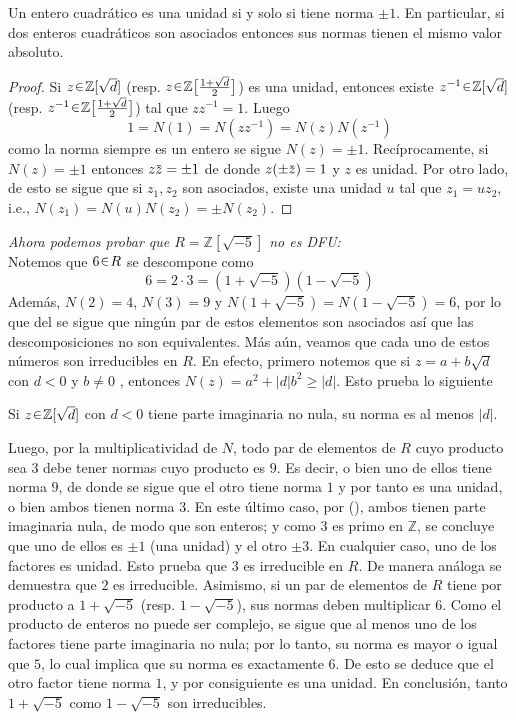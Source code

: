 \begin{sol}
\begin{enumerate}[label={\bfseries\Roman*}., wide, itemsep=1em]
\begin{lema}\label{lema:unidades}
Un entero cuadrático es una unidad si y solo si tiene norma $\pm1$. En particular, si dos enteros cuadráticos son asociados entonces sus normas tienen el mismo valor absoluto.
\end{lema}\vspace{-1.5em}
\begin{proof}
Si $z \en \mathbb{Z}[\sqrt{d}]$ (resp. $z\en\mathbb{Z}\big[\frac{1+\sqrt{d}}{2}\big]$) es una unidad, entonces existe $z^{-1} \en \mathbb{Z}[\sqrt{d}]$ (resp. $z^{-1}\en\mathbb{Z}\big[\frac{1+\sqrt{d}}{2}\big]$) tal que $zz^{-1} = 1$. Luego \[1 = N(1) = N(zz^{-1}) = N(z)N(z^{-1})\] como la norma siempre es un entero se sigue $N(z) = \pm1$. Recíprocamente, si $N(z) = \pm1$ entonces $z\ubar{z} = \pm1$ de donde $z(\pm\ubar{z}) = 1$ y $z$ es unidad. Por otro lado, de esto se sigue que si $z_1,z_2$ son asociados, existe una unidad $u$ tal que $z_1 = uz_2$, i.e., $N(z_1) = N(u)N(z_2) = \pm N(z_2)$.
\end{proof}
\emph{Ahora podemos probar que $R = \mathbb{Z}[\sqrt{-5}]$ no es DFU:}\\
Notemos que $6 \en R$ se descompone como  
\[
6 = 2 \cdot 3 = (1 + \sqrt{-5})(1 - \sqrt{-5})
\]
Además, $N(2) = 4$, $N(3) = 9$ y $N(1+\sqrt{-5}) = N(1-\sqrt{-5}) = 6$, por lo que del  se sigue que ningún par de estos elementos son asociados así que las descomposiciones no son equivalentes. Más aún, veamos que cada uno de estos números son irreducibles en $R$. En efecto, primero notemos que si $z = a + b\sqrt{d}$ con $d<0$ y $b\neq0$ , entonces $N(z) = a^2 + |d|b^2 \geq |d|$. Esto prueba lo siguiente
\begin{lema}\label{lema:normamin}
Si $z \en \mathbb{Z}[\sqrt{d}]$ con $d<0$ tiene parte imaginaria no nula, su norma es al menos $|d|$.  
\end{lema}\vspace{-0.5em}
Luego, por la multiplicatividad de $N$, todo par de elementos de $R$ cuyo producto sea $3$ debe tener normas cuyo producto es $9$. Es decir, o bien uno de ellos tiene norma $9$, de donde se sigue que el otro tiene norma $1$ y por tanto es una unidad, o bien ambos tienen norma $3$. En este último caso, por (), ambos tienen parte imaginaria nula, de modo que son enteros; y como $3$ es primo en $\mathbb{Z}$, se concluye que uno de ellos es $\pm1$ (una unidad) y el otro $\pm3$. En cualquier caso, uno de los factores es unidad. Esto prueba que $3$ es irreducible en $R$. De manera análoga se demuestra que $2$ es irreducible. Asimismo, si un par de elementos de $R$ tiene por producto a $1+\sqrt{-5}$ (resp. $1-\sqrt{-5}$), sus normas deben multiplicar $6$. Como el producto de enteros no puede ser complejo, se sigue que al menos uno de los factores tiene parte imaginaria no nula; por lo tanto, su norma es mayor o igual que $5$, lo cual implica que su norma es exactamente $6$. De esto se deduce que el otro factor tiene norma $1$, y por consiguiente es una unidad. En conclusión, tanto $1+\sqrt{-5}$ como $1-\sqrt{-5}$ son irreducibles.\par

\end{enumerate}
\end{sol}
